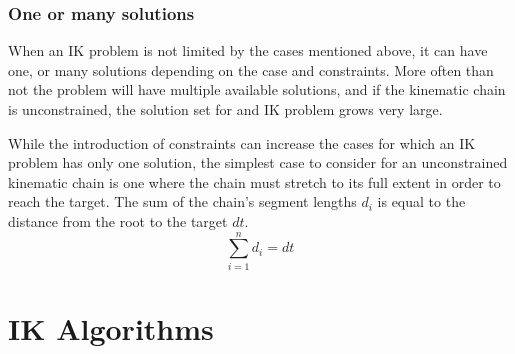 \subsubsection{One or many solutions}
When an IK problem is not limited by the cases mentioned above, it can have one,
or many solutions depending on the case and constraints. More often than not the
problem will have multiple available solutions, and if the kinematic chain is
unconstrained, the solution set for and IK problem grows very large.

While the introduction of constraints can increase the cases for which an IK
problem has only one solution, the simplest case to consider for an
unconstrained kinematic chain is one where the chain must stretch to its full
extent in order to reach the target. The sum of the chain's segment lengths
\(d_i\) is equal to the distance from the root to the target \(dt\).
\[
    \sum_{i=1}^{n}d_i = dt
    \]

\section{IK Algorithms}
